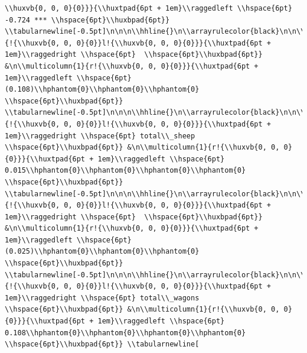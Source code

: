 \documentclass[11pt,preprint, authoryear]{elsarticle}
\numberwithin{equation}{section}
\numberwithin{figure}{section}
\numberwithin{table}{section}
\begin{document}
\begin{verbatim}
\\huxvb{0, 0, 0}{0}}}{\\huxtpad{6pt + 1em}\\raggedleft \\hspace{6pt} -0.724 *** \\hspace{6pt}\\huxbpad{6pt}} \\tabularnewline[-0.5pt]\n\n\n\\hhline{}\n\\arrayrulecolor{black}\n\n\\multicolumn{1}{!{\\huxvb{0, 0, 0}{0}}l!{\\huxvb{0, 0, 0}{0}}}{\\huxtpad{6pt + 1em}\\raggedright \\hspace{6pt}  \\hspace{6pt}\\huxbpad{6pt}} &\n\\multicolumn{1}{r!{\\huxvb{0, 0, 0}{0}}}{\\huxtpad{6pt + 1em}\\raggedleft \\hspace{6pt} (0.108)\\hphantom{0}\\hphantom{0}\\hphantom{0} \\hspace{6pt}\\huxbpad{6pt}} \\tabularnewline[-0.5pt]\n\n\n\\hhline{}\n\\arrayrulecolor{black}\n\n\\multicolumn{1}{!{\\huxvb{0, 0, 0}{0}}l!{\\huxvb{0, 0, 0}{0}}}{\\huxtpad{6pt + 1em}\\raggedright \\hspace{6pt} total\\_sheep \\hspace{6pt}\\huxbpad{6pt}} &\n\\multicolumn{1}{r!{\\huxvb{0, 0, 0}{0}}}{\\huxtpad{6pt + 1em}\\raggedleft \\hspace{6pt} 0.015\\hphantom{0}\\hphantom{0}\\hphantom{0}\\hphantom{0} \\hspace{6pt}\\huxbpad{6pt}} \\tabularnewline[-0.5pt]\n\n\n\\hhline{}\n\\arrayrulecolor{black}\n\n\\multicolumn{1}{!{\\huxvb{0, 0, 0}{0}}l!{\\huxvb{0, 0, 0}{0}}}{\\huxtpad{6pt + 1em}\\raggedright \\hspace{6pt}  \\hspace{6pt}\\huxbpad{6pt}} &\n\\multicolumn{1}{r!{\\huxvb{0, 0, 0}{0}}}{\\huxtpad{6pt + 1em}\\raggedleft \\hspace{6pt} (0.025)\\hphantom{0}\\hphantom{0}\\hphantom{0} \\hspace{6pt}\\huxbpad{6pt}} \\tabularnewline[-0.5pt]\n\n\n\\hhline{}\n\\arrayrulecolor{black}\n\n\\multicolumn{1}{!{\\huxvb{0, 0, 0}{0}}l!{\\huxvb{0, 0, 0}{0}}}{\\huxtpad{6pt + 1em}\\raggedright \\hspace{6pt} total\\_wagons \\hspace{6pt}\\huxbpad{6pt}} &\n\\multicolumn{1}{r!{\\huxvb{0, 0, 0}{0}}}{\\huxtpad{6pt + 1em}\\raggedleft \\hspace{6pt} 0.108\\hphantom{0}\\hphantom{0}\\hphantom{0}\\hphantom{0} \\hspace{6pt}\\huxbpad{6pt}} \\tabularnewline[
\end{verbatim}
\end{document}
